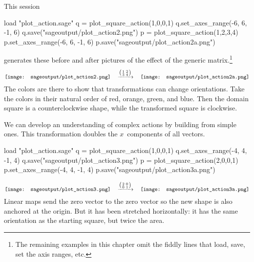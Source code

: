 This \Sage{} session
\begin{sageoutput}
load "plot_action.sage"
q = plot_square_action(1,0,0,1) 
q.set_axes_range(-6, 6, -1, 6) 
q.save("sageoutput/plot_action2.png")
p = plot_square_action(1,2,3,4) 
p.set_axes_range(-6, 6, -1, 6) 
p.save("sageoutput/plot_action2a.png")
\end{sageoutput}
\noindent generates these before and 
after pictures of the effect of the generic  
matrix.\footnote{The remaining examples in this chapter omit the 
fiddly lines that load, save, set the axis ranges, etc.}
\begin{equation*}
  \vcenteredhbox{\texttt{[image: sageoutput/plot\_action2.png]}}
  \quad\mapsvia{\big (\begin{smallmatrix} 1 &2 \\ 3 &4 \end{smallmatrix}\big )}\quad
  \vcenteredhbox{\texttt{[image: sageoutput/plot\_action2a.png]}}
\end{equation*}
The colors are there to show that transformations can change
orientations.
Take the colors in their natural order of red, orange, 
green, and blue.
Then the domain square is a counterclockwise shape, while the transformed
square is clockwise.

We can develop an understanding of complex actions by 
building from simple ones.
This transformation doubles the $x$~components of all vectors. 
\begin{sageoutput}[d,0,4;d,5,7]
load "plot_action.sage"
q = plot_square_action(1,0,0,1) 
q.set_axes_range(-4, 4, -1, 4) 
q.save("sageoutput/plot_action3.png")
p = plot_square_action(2,0,0,1) 
p.set_axes_range(-4, 4, -1, 4) 
p.save("sageoutput/plot_action3a.png")
\end{sageoutput}
\begin{equation*}
  \vcenteredhbox{\texttt{[image: sageoutput/plot\_action3.png]}}
  \quad\mapsvia{\big (\begin{smallmatrix} 2 &0 \\ 0 &1 \end{smallmatrix}\big )}\quad
  \vcenteredhbox{\texttt{[image: sageoutput/plot\_action3a.png]}}
\end{equation*}
\noindent
Linear maps send the zero vector to the zero vector so 
the new shape is also anchored at the origin.
But it has been stretched horizontally: it has the same orientation
as the starting square, but twice the area.

